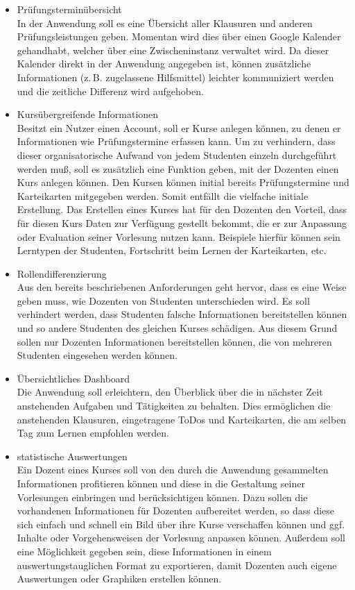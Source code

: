 \begin{itemize}
    \item Prüfungsterminübersicht           \\
        In der Anwendung soll es eine Übersicht aller Klausuren und anderen Prüfungsleistungen geben.
        Momentan wird dies über einen Google Kalender gehandhabt, welcher über eine Zwischeninstanz verwaltet wird.
        Da dieser Kalender direkt in der Anwendung angegeben ist, können zusätzliche Informationen (z.\,B. zugelassene Hilfsmittel) leichter kommuniziert werden und die zeitliche Differenz wird aufgehoben.

    \item Kursübergreifende Informationen   \\
        Besitzt ein Nutzer einen Account, soll er Kurse anlegen können, zu denen er Informationen wie  Prüfungstermine erfassen kann.
        Um zu verhindern, dass dieser organisatorische Aufwand von jedem Studenten einzeln durchgeführt werden muß, soll es zusätzlich eine Funktion geben, mit der Dozenten einen Kurs anlegen können.
        Den Kursen können initial bereits Prüfungstermine und Karteikarten mitgegeben werden.
        Somit entfällt die vielfache initiale Erstellung.
        Das Erstellen eines Kurses hat für den Dozenten den Vorteil, dass für diesen Kurs Daten zur Verfügung gestellt bekommt, die er zur Anpassung oder Evaluation seiner Vorlesung nutzen kann.
        Beispiele hierfür können sein Lerntypen der Studenten, Fortschritt beim Lernen der Karteikarten, etc.
    \item Rollendifferenzierung             \\
        Aus den bereits beschriebenen Anforderungen geht hervor, dass es eine Weise geben muss, wie Dozenten von Studenten unterschieden wird.
        Es soll verhindert werden, dass Studenten falsche Informationen bereitstellen können und so andere Studenten des gleichen Kurses schädigen.
        Aus diesem Grund sollen nur Dozenten Informationen bereitstellen können, die von mehreren Studenten eingesehen werden können.
    \item Übersichtliches Dashboard			\\
   		Die Anwendung soll erleichtern, den Überblick über die in nächster Zeit anstehenden Aufgaben und Tätigkeiten zu behalten. Dies ermöglichen die anstehenden Klausuren, eingetragene ToDos und Karteikarten, die am selben Tag zum Lernen empfohlen werden.
    \item statistische Auswertungen         \\
        Ein Dozent eines Kurses soll von den durch die Anwendung gesammelten Informationen profitieren können und diese in die Gestaltung seiner Vorlesungen einbringen und berücksichtigen können. Dazu sollen die vorhandenen Informationen für Dozenten aufbereitet werden, so dass diese sich einfach und schnell ein Bild über ihre Kurse verschaffen können und ggf. Inhalte oder Vorgehensweisen der Vorlesung anpassen können. Außerdem soll eine Möglichkeit gegeben sein, diese Informationen in einem auswertungstauglichen Format zu exportieren, damit Dozenten auch eigene Auswertungen oder Graphiken erstellen können.

\end{itemize}
